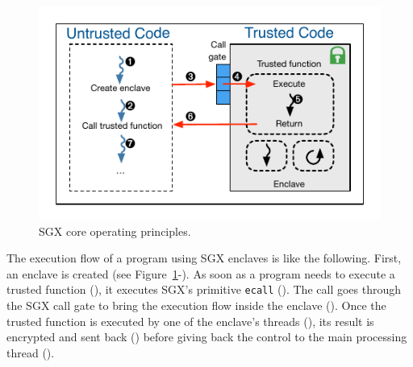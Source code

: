 \begin{figure}[H]
  \centering
  \includegraphics[width=0.65\linewidth]{Figures/sgx}
  \caption{SGX core operating principles.}
  \label{fig:sgx}
\end{figure}

The execution flow of a program using SGX enclaves is like the following.
First, an enclave is created (see Figure~\ref{fig:sgx}-).
As soon as a program needs to execute a trusted function (), it executes SGX's primitive \texttt{ecall} ().
The call goes through the SGX call gate to bring the execution flow inside the enclave ().
Once the trusted function is executed by one of the enclave's threads (), its result is encrypted and sent back () before giving back the control to the main processing thread ().
